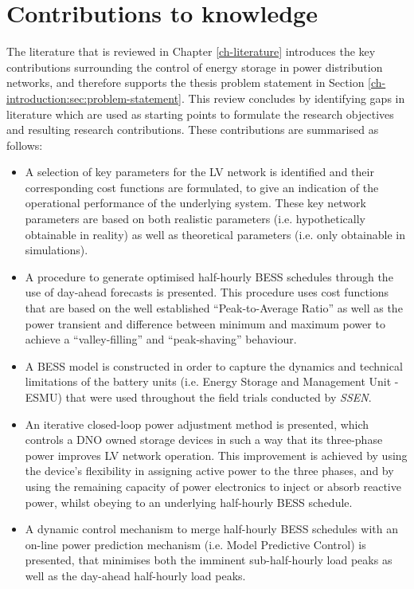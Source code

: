 \section{Contributions to knowledge}
\label{ch-introduction:sec:contributions}

The literature that is reviewed in Chapter \ref{ch-literature} introduces the key contributions surrounding the control of energy storage in power distribution networks, and therefore supports the thesis problem statement in Section \ref{ch-introduction:sec:problem-statement}.
This review concludes by identifying gaps in literature which are used as starting points to formulate the research objectives and resulting research contributions.
These contributions are summarised as follows:

\begin{itemize}
	\item
	A selection of key parameters for the LV network is identified and their corresponding cost functions are formulated, to give an indication of the operational performance of the underlying system.
	These key network parameters are based on both realistic parameters (i.e. hypothetically obtainable in reality) as well as theoretical parameters (i.e. only obtainable in simulations).
	\item
	A procedure to generate optimised half-hourly BESS schedules through the use of day-ahead forecasts is presented.
	This procedure uses cost functions that are based on the well established ``Peak-to-Average Ratio'' as well as the power transient and difference between minimum and maximum power to achieve a ``valley-filling'' and ``peak-shaving'' behaviour.
	\item
	A BESS model is constructed in order to capture the dynamics and technical limitations of the battery units (i.e. Energy Storage and Management Unit - ESMU) that were used throughout the field trials conducted by \textit{SSEN}.
	\item
	An iterative closed-loop power adjustment method is presented, which controls a DNO owned storage devices in such a way that its three-phase power improves LV network operation.
	This improvement is achieved by using the device's flexibility in assigning active power to the three phases, and by using the remaining capacity of power electronics to inject or absorb reactive power, whilst obeying to an underlying half-hourly BESS schedule.
	\item
	A dynamic control mechanism to merge half-hourly BESS schedules with an on-line power prediction mechanism (i.e. Model Predictive Control) is presented, that minimises both the imminent sub-half-hourly load peaks as well as the day-ahead half-hourly load peaks.

\end{itemize}
